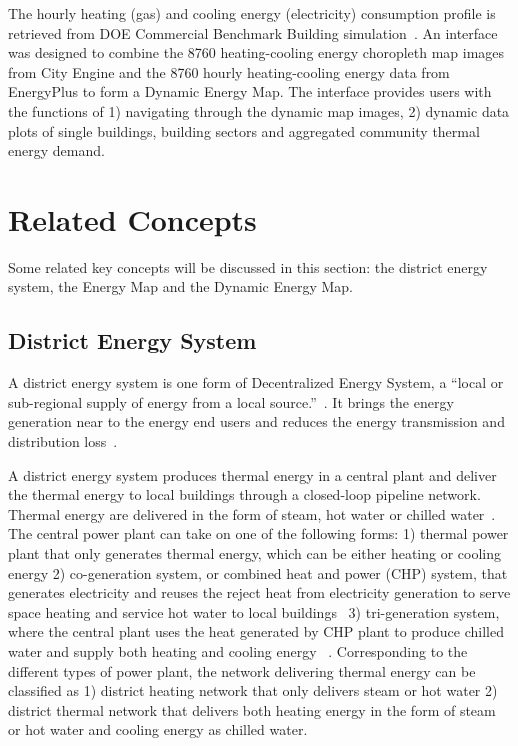 The hourly heating (gas) and cooling energy (electricity) consumption
profile is retrieved from DOE Commercial Benchmark Building
simulation~\cite{DOE2015}. An interface was designed to combine the
8760 heating-cooling energy choropleth map images from City Engine and
the 8760 hourly heating-cooling energy data from EnergyPlus to form a
Dynamic Energy Map. The interface provides users with the functions of
1) navigating through the dynamic map images, 2) dynamic data
plots of single buildings, building sectors and aggregated community
thermal energy demand.

\section{Related Concepts}\label{concept}
Some related key concepts will be discussed in this section: the
district energy system, the Energy Map and the Dynamic Energy Map.

\subsection{District Energy System}
A district energy system is one form of Decentralized Energy System, a
``local or sub-regional supply of energy from a local
source.''~\cite{lhmreport2012}. It brings the energy generation near
to the energy end users and reduces the energy transmission and
distribution loss~\cite{decentralHeatMap2011}.

A district energy system produces thermal energy in a central plant
and deliver the thermal energy to local buildings through a
closed-loop pipeline network. Thermal energy are delivered in the form
of steam, hot water or chilled water~\cite{baird2014}. The central
power plant can take on one of the following forms: 1) thermal power
plant that only generates thermal energy, which can be either heating
or cooling energy 2) co-generation system, or combined heat and power
(CHP) system, that generates electricity and reuses the reject heat
from electricity generation to serve space heating and service hot
water to local buildings~\cite{IDEA2005} 3) tri-generation system,
where the central plant uses the heat generated by CHP plant to
produce chilled water and supply both heating and cooling energy
~\cite{cchp2015}. Corresponding to the different types of power plant,
the network delivering thermal energy can be classified as 1) district
heating network that only delivers steam or hot water 2) district
thermal network that delivers both heating energy in the form of steam
or hot water and cooling energy as chilled water.

